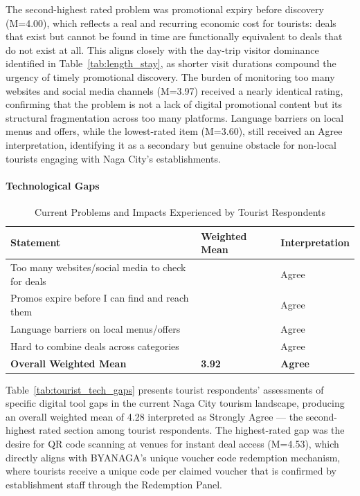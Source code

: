\documentclass{research}
\begin{document}
The second-highest rated problem was promotional expiry before discovery 
(M=4.00), which reflects a real and recurring economic cost for tourists: deals 
that exist but cannot be found in time are functionally equivalent to deals that 
do not exist at all. This aligns closely with the day-trip visitor dominance 
identified in Table~\ref{tab:length_stay}, as shorter visit durations compound 
the urgency of timely promotional discovery. The burden of monitoring too many 
websites and social media channels (M=3.97) received a nearly identical rating, 
confirming that the problem is not a lack of digital promotional content but its 
structural fragmentation across too many platforms. Language barriers on local 
menus and offers, while the lowest-rated item (M=3.60), still received an Agree 
interpretation, identifying it as a secondary but genuine obstacle for non-local 
tourists engaging with Naga City's establishments.

\paragraph{Technological Gaps}

\begin{table}[h]
\centering
\caption{Current Problems and Impacts Experienced by Tourist Respondents}
\label{tab:tourist_problems}
\begin{tabularx}{\textwidth}{>{\raggedright\arraybackslash}X>{\centering\arraybackslash}p{2.5cm}>{\centering\arraybackslash}p{3cm}}
\toprule
\textbf{Statement} & \textbf{Weighted Mean} & \textbf{Interpretation} \\
\midrule
Too many websites/social media to check for deals & 3.97 & Agree \\
Promos expire before I can find and reach them & 4.00 & Agree \\
Language barriers on local menus/offers & 3.60 & Agree \\
Hard to combine deals across categories & 4.10 & Agree \\
\midrule
\textbf{Overall Weighted Mean} & \textbf{3.92} & \textbf{Agree} \\
\bottomrule
\end{tabularx}
\end{table}

Table~\ref{tab:tourist_tech_gaps} presents tourist respondents' assessments of 
specific digital tool gaps in the current Naga City tourism landscape, producing 
an overall weighted mean of 4.28 interpreted as Strongly Agree --- the 
second-highest rated section among tourist respondents. The highest-rated gap 
was the desire for QR code scanning at venues for instant deal access (M=4.53), 
which directly aligns with BYANAGA's unique voucher code redemption mechanism, 
where tourists receive a unique code per claimed voucher that is confirmed by 
establishment staff through the Redemption Panel.
\end{document}
